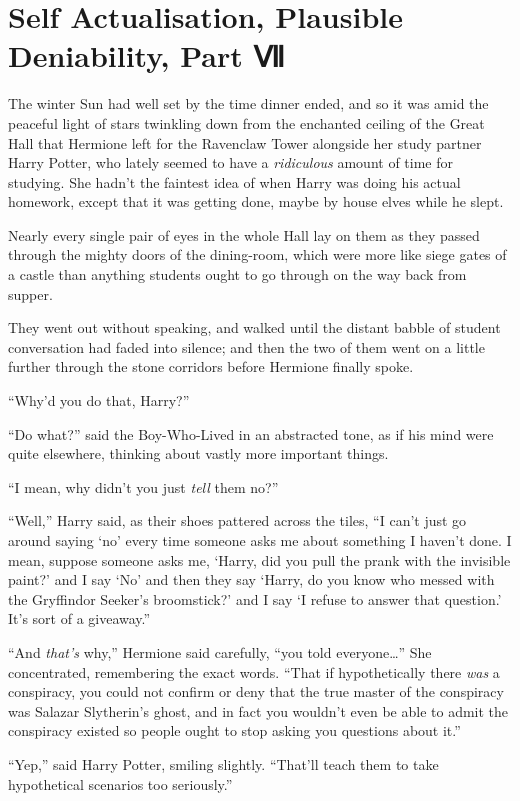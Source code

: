 \chapter{Self Actualisation, Plausible Deniability, Part Ⅶ}

The winter Sun had well set by the time dinner ended, and so it was amid
the peaceful light of stars twinkling down from the enchanted ceiling of
the Great Hall that Hermione left for the Ravenclaw Tower alongside her
study partner Harry Potter, who lately seemed to have a
\emph{ridiculous} amount of time for studying. She hadn't the faintest
idea of when Harry was doing his actual homework, except that it was
getting done, maybe by house elves while he slept.

Nearly every single pair of eyes in the whole Hall lay on them as they
passed through the mighty doors of the dining-room, which were more like
siege gates of a castle than anything students ought to go through on
the way back from supper.

They went out without speaking, and walked until the distant babble of
student conversation had faded into silence; and then the two of them
went on a little further through the stone corridors before Hermione
finally spoke.

``Why'd you do that, Harry?''

``Do what?'' said the Boy-Who-Lived in an abstracted tone, as if his
mind were quite elsewhere, thinking about vastly more important things.

``I mean, why didn't you just \emph{tell} them no?''

``Well,'' Harry said, as their shoes pattered across the tiles, ``I
can't just go around saying `no' every time someone asks me about
something I haven't done. I mean, suppose someone asks me, `Harry, did
you pull the prank with the invisible paint?' and I say `No' and then
they say `Harry, do you know who messed with the Gryffindor Seeker's
broomstick?' and I say `I refuse to answer that question.' It's sort of
a giveaway.''

``And \emph{that's} why,'' Hermione said carefully, ``you told
everyone\ldots{}'' She concentrated, remembering the exact words. ``That
if hypothetically there \emph{was} a conspiracy, you could not confirm
or deny that the true master of the conspiracy was Salazar Slytherin's
ghost, and in fact you wouldn't even be able to admit the conspiracy
existed so people ought to stop asking you questions about it.''

``Yep,'' said Harry Potter, smiling slightly. ``That'll teach them to
take hypothetical scenarios too seriously.''

